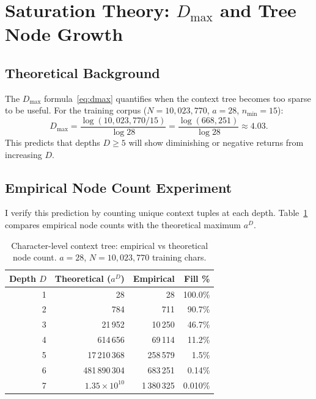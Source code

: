 \documentclass[11pt,a4paper]{article}
\newcommand{\dmax}{D_{\max}}
\begin{document}
\section{Saturation Theory: $D_{\max}$ and Tree Node Growth}
\label{sec:dmax}

\subsection{Theoretical Background}

The $\dmax$ formula~\eqref{eq:dmax} quantifies when the context tree
becomes too sparse to be useful.
For the training corpus ($N = 10{,}023{,}770$, $a = 28$, $n_{\min} = 15$):
\[
  \dmax = \frac{\log(10{,}023{,}770/15)}{\log 28}
  = \frac{\log(668{,}251)}{\log 28} \approx 4.03.
\]
This predicts that depths $D \ge 5$ will show diminishing or negative returns
from increasing $D$.

\subsection{Empirical Node Count Experiment}

I verify this prediction by counting unique context tuples at each depth.
Table~\ref{tab:nodes_char} compares empirical node counts with the
theoretical maximum $a^D$.

\begin{table}[H]
\centering
\caption{Character-level context tree: empirical vs theoretical node count.
$a = 28$, $N = 10{,}023{,}770$ training chars.}
\label{tab:nodes_char}
{\small\setlength{\tabcolsep}{6pt}
\begin{tabular}{rrrr}
\toprule
\textbf{Depth $D$} & \textbf{Theoretical ($a^D$)} & \textbf{Empirical} & \textbf{Fill \%} \\
\midrule
1 & 28                    & 28          & 100.0\% \\
2 & 784                   & 711         & 90.7\% \\
3 & 21\,952               & 10\,250     & 46.7\% \\
4 & 614\,656              & 69\,114     & 11.2\% \\
5 & 17\,210\,368          & 258\,579    & 1.5\% \\
6 & 481\,890\,304         & 683\,251    & 0.14\% \\
7 & $1.35\times 10^{10}$  & 1\,380\,325 & 0.010\% \\
\bottomrule
\end{tabular}}
\end{table}
\end{document}
